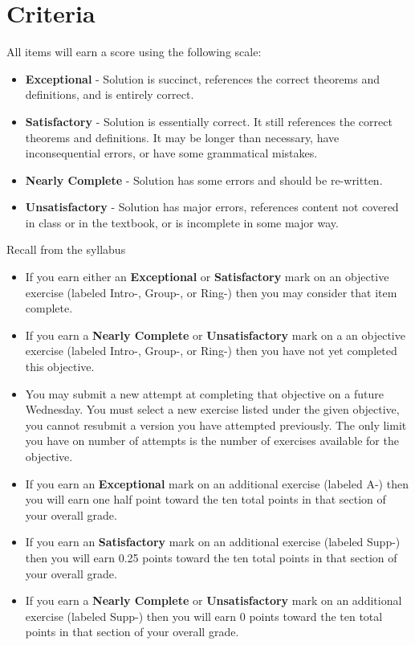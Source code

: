 \documentclass[12pt]{article}
\begin{document}
	\section*{Criteria}
		All items will earn a score using the following scale:
		\begin{itemize}
			\item \textbf{Exceptional} - Solution is succinct, references the correct theorems and definitions, and is entirely correct.
			\item \textbf{Satisfactory} - Solution is essentially correct. It still references the correct theorems and definitions. 
					It may be longer than necessary, have inconsequential errors, or have some grammatical mistakes.
			\item \textbf{Nearly Complete} - Solution has some errors and should be re-written.
			\item \textbf{Unsatisfactory} - Solution has major errors, references content not covered in class or in the textbook, or is incomplete in some major way.
		\end{itemize}
		Recall from the syllabus
		\begin{itemize}
			\item If you earn either an \textbf{Exceptional} or \textbf{Satisfactory} mark on an objective exercise (labeled Intro-, Group-, or Ring-) then you may consider that item complete. 
			\item If you earn a \textbf{Nearly Complete} or \textbf{Unsatisfactory} mark on a an objective exercise (labeled Intro-, Group-, or Ring-) then you have not yet completed this objective.
			\item You may submit a new attempt at completing that objective on a future Wednesday. You must select a new exercise listed under the given objective, you cannot resubmit a version you have attempted previously.  The only limit you have on number of attempts is the number of exercises available for the objective.
			\item If you earn an \textbf{Exceptional} mark on an additional exercise (labeled A-) then you will earn one half point toward the ten total points in that section of your overall grade.
			\item If you earn an \textbf{Satisfactory} mark on an additional exercise (labeled Supp-) then you will earn 0.25 points toward the ten total points in that section of your overall grade. 
			\item If you earn a \textbf{Nearly Complete} or \textbf{Unsatisfactory} mark on an additional exercise (labeled Supp-) then you will earn 0 points toward the ten total points in that section of your overall grade. 
		\end{itemize}
	
\end{document}
